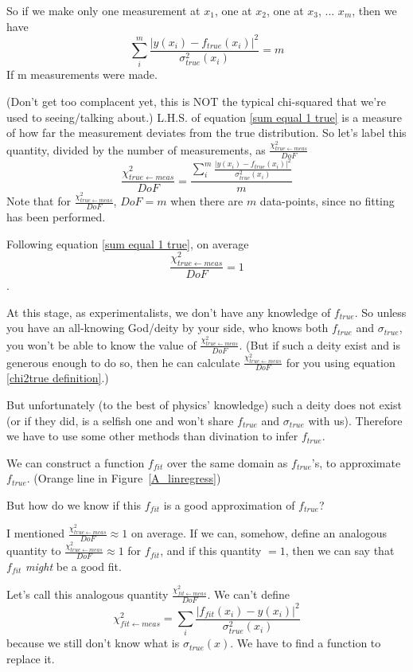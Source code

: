 \documentclass[a4paper, 12pt]{article}
\newcommand{\chifit}{\frac{\chi^2_{fit\leftarrow meas}}{DoF} }
\newcommand{\chitrue}{\frac{\chi^2_{true\leftarrow meas}}{DoF}}
\begin{document}
So if we make only one measurement at $x_1$, one at $x_2$, one at $x_3$, ... $x_m$, then we have
\begin{equation}\label{sum equal 1 true}
    \sum_i^m \frac{|y(x_i)-f_{true}(x_i)|^2}{\sigma^2_{true}(x_i)}=m
\end{equation}
If m measurements were made. 

(Don't get too complacent yet, this is NOT the typical chi-squared that we're used to seeing/talking about.)
L.H.S. of equation \ref{sum equal 1 true} is a measure of how far the measurement deviates from the true distribution. So let's label this quantity, divided by the number of measurements, as $\chitrue$
\begin{equation}\label{chi2true definition}
\chitrue = \frac{\sum_i^m \frac{|y(x_i)-f_{true}(x_i)|^2}{\sigma^2_{true}(x_i)}}{m}
\end{equation}
Note that for $\chitrue$, $DoF=m$ when there are $m$ data-points, since no fitting has been performed.

Following equation \ref{sum equal 1 true}, on average $$\chitrue=1$$.

At this stage, as experimentalists, we don't have any knowledge of $f_{true}$. So unless you have an all-knowing God/deity by your side, who knows both $f_{true}$ and $\sigma_{true}$, you won't be able to know the value of $\chitrue$. (But if such a deity exist and is generous enough to do so, then he can calculate $\chitrue$ for you using equation \ref{chi2true definition}.)

But unfortunately (to the best of physics' knowledge) such a deity does not exist (or if they did, is a selfish one and won't share $f_{true}$ and $\sigma_{true}$ with us). Therefore we have to use some other methods than divination to infer $f_{true}$.

We can construct a function $f_{fit}$ over the same domain as $f_{true}$'s, to approximate $f_{true}$. (Orange line in Figure~\ref{A_linregress})

But how do we know if this $f_{fit}$ is a good approximation of $f_{true}$?

I mentioned $\chitrue \approx 1$ on average. If we can, somehow, define an analogous quantity to $\chitrue \approx 1$ for $f_{fit}$, and if this quantity $=1$, then we can say that $f_{fit}$ \textit{might} be a good fit. 

Let's call this analogous quantity $\chifit$. We can't define $$\chi^2_{fit\leftarrow meas} = \sum_i \frac{|f_{fit}(x_i) - y(x_i)|^2}{\sigma_{true}^2(x_i)}$$ because we still don't know what is $\sigma_{true}(x)$. We have to find a function to replace it.
\end{document}
